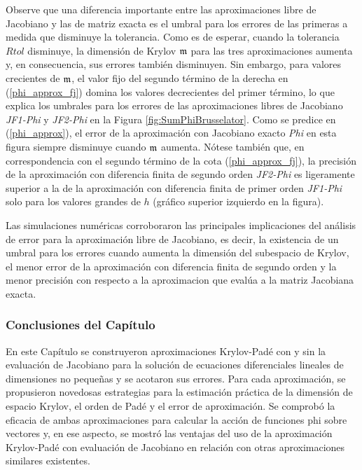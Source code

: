 Observe que una diferencia importante entre las aproximaciones libre de Jacobiano y las de matriz exacta es el umbral para los errores de las primeras a medida que disminuye la tolerancia. Como es de esperar, cuando la tolerancia $Rtol$ disminuye, la dimensión de Krylov $\mathfrak{m}$ para las tres aproximaciones aumenta y, en consecuencia, sus errores también disminuyen. Sin embargo, para valores crecientes de $\mathfrak{m}$, el valor fijo del segundo término de la derecha en (\ref{phi_approx_fj}) domina los valores decrecientes del primer término, lo que explica los umbrales para los errores de las aproximaciones libres de Jacobiano \textit{JF1-Phi} y \textit{JF2-Phi} en la Figura \ref{fig:SumPhiBrusselator}. Como se predice en (\ref{phi_approx}), el error de la aproximación con Jacobiano exacto \textit{Phi} en esta figura siempre disminuye cuando $\mathfrak{m}$ aumenta. Nótese también que, en correspondencia con el segundo término de la cota (\ref{phi_approx_fj}), la precisión de la aproximación con diferencia finita de segundo orden \textit{JF2-Phi} es ligeramente superior a la de la aproximación con diferencia finita de primer orden \textit{JF1-Phi} solo para los valores grandes de $h$ (gráfico superior izquierdo en la figura).

Las simulaciones numéricas corroboraron las principales implicaciones del análisis de error para la aproximación libre de Jacobiano, es decir, la existencia de un umbral para los errores cuando aumenta la dimensión del subespacio de Krylov, el menor error de la aproximación con diferencia finita de segundo orden y la menor precisión con respecto a la aproximacion que evalúa a la matriz Jacobiana exacta.

\subsubsection{Conclusiones del Capítulo}
En este Capítulo se construyeron aproximaciones Krylov-Padé con y sin la evaluación de Jacobiano para la solución de ecuaciones diferenciales lineales de dimensiones no pequeñas y se acotaron sus errores. Para cada aproximación, se propusieron novedosas estrategias para la estimación práctica de la dimensión de espacio Krylov, el orden de Padé y el error de aproximación. Se comprobó la eficacia de ambas aproximaciones para calcular la acción de funciones phi sobre vectores y, en ese aspecto, se
mostró las ventajas del uso de la aproximación Krylov-Padé con evaluación de Jacobiano en relación con otras aproximaciones similares existentes.

